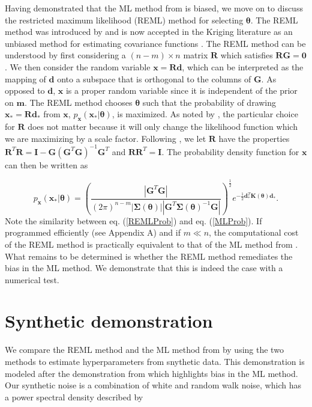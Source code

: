 \documentclass[10pt,a4paper]{article}
\begin{document}
Having demonstrated that the ML method from \citet{Langbein1997} is biased, we move on to discuss the restricted maximum likelihood (REML) method for selecting $\mathbf{\theta}$.  The REML method was introduced by \citet{Patterson1971} and is now accepted in the Kriging literature as an unbiased method for estimating covariance functions \citep[e.g.][]{Cressie1992}. The REML method can be understood by first considering a $(n-m)\times n$ matrix $\mathbf{R}$ which satisfies $\mathbf{R}\mathbf{G}=\mathbf{0}$.  We then consider the random variable $\mathbf{x}=\mathbf{R}\mathbf{d}$, which can be interpreted as the mapping of $\mathbf{d}$ onto a subspace that is orthogonal to the columns of $\mathbf{G}$. As opposed to $\mathbf{d}$, $\mathbf{x}$ is a proper random variable since it is independent of the prior on $\mathbf{m}$. The REML method chooses $\mathbf{\theta}$ such that the probability of drawing $\mathbf{x}_*=\mathbf{R}\mathbf{d}_*$ from $\mathbf{x}$, $p_\mathbf{x}(\mathbf{x}_*|\mathbf{\theta})$, is maximized. As noted by \citet{Harville1974}, the particular choice for $\mathbf{R}$ does not matter because it will only change the likelihood function which we are maximizing by a scale factor. Following \citet{Harville1974}, we let $\mathbf{R}$ have the properties $\mathbf{R}^T\mathbf{R} = \mathbf{I} - \mathbf{G}(\mathbf{G}^T\mathbf{G})^{-1}\mathbf{G}^T$ and $\mathbf{R}\mathbf{R}^T = \mathbf{I}$. The probability density function for $\mathbf{x}$ can then be written as 

\begin{equation}\label{REMLProb}
p_\mathbf{x}(\mathbf{x}_*|\mathbf{\theta}) =
\left(\frac{\left|\mathbf{G}^T\mathbf{G}\right|}
           {(2\pi)^{n-m}
            \left| \mathbf{\Sigma}(\mathbf{\theta}) \right| 
            \left| \mathbf{G}^T\mathbf{\Sigma}(\mathbf{\theta})^{-1}\mathbf{G} \right|}\right)^{\frac{1}{2}} 
e^{-\tfrac{1}{2}\mathbf{d}_*^T\mathbf{K}(\mathbf{\theta})\mathbf{d}_*} .
\end{equation}
Note the similarity between eq. (\ref{REMLProb}) and eq. (\ref{MLProb}). If programmed efficiently (see Appendix A) and if $m \ll n$, the computational cost of the REML method is practically equivalent to that of the ML method from \citet{Langbein1997}. What remains to be determined is whether the REML method remediates the bias in the ML method. We demonstrate that this is indeed the case with a numerical test. 

\section{Synthetic demonstration}
We compare the REML method and the ML method from \citet{Langbein1997} by using the two methods to estimate hyperparameters from snythetic data. This demonstration is modeled after the demonstration from \citet{Langbein2012} which highlights bias in the ML method. Our synthetic noise is a combination of white and random walk noise, which has a power spectral density described by
\end{document}
